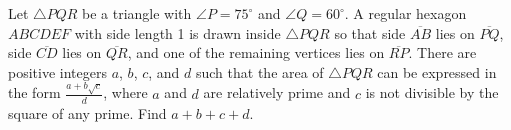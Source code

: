 Let $\triangle PQR$ be a triangle with $\angle P = 75^\circ$ and $\angle Q = 60^\circ$. A regular hexagon $ABCDEF$ with side length 1 is drawn inside $\triangle PQR$ so that side $\overline{AB}$ lies on $\overline{PQ}$, side $\overline{CD}$ lies on $\overline{QR}$, and one of the remaining vertices lies on $\overline{RP}$. There are positive integers $a$, $b$, $c$, and $d$ such that the area of $\triangle PQR$ can be expressed in the form $\tfrac{a+b\sqrt c}d$, where $a$ and $d$ are relatively prime and $c$ is not divisible by the square of any prime. Find $a+b+c+d$.